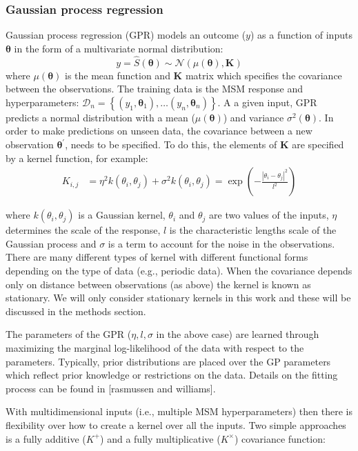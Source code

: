 \documentclass[journal=jacsat,manuscript=article]{achemso}
\begin{document}
\subsubsection{Gaussian process regression}

Gaussian process regression (GPR) models an outcome ($y$) as a function of inputs $\bm{\theta}$ in the form of a multivariate normal distribution: 
\begin{equation}
   y = \hat{S}(\bm{\theta}) \sim \mathcal{N}\left(\mu(\bm{\theta}), \mathbf{K}\right )
\end{equation}
where $\mu(\bm{\theta})$ is the mean function and $\mathbf{K}$ matrix which specifies the covariance between the observations. The training data is the MSM response and hyperparameters: $\mathcal{D}_{n}=\left\{(y_1, \bm{\theta}_1),  \ldots (y_n, \bm{\theta}_n) \right \}$. A a given input, GPR predicts a normal distribution with a mean ($\mu(\bm{\theta})$) and variance $\sigma^{2}(\bm{\theta})$. In order to make predictions on unseen data, the covariance between a new observation $\bm{\theta}^{\prime}$, needs to be specified. To do this, the elements of $\mathbf{K}$ are specified by a kernel function, for example: 
\begin{align}
    K_{i,j} & = \eta^2  k(\theta_i, \theta_j) + \sigma^2
    k(\theta_i, \theta_j) =  \exp\left(-\frac{\left|\theta_i-\theta_j\right|^2}{l^2}\right)
\end{align}

where $k(\theta_i, \theta_j)$ is a Gaussian kernel,  $\theta_i$ and $\theta_j$ are two values of the inputs, $\eta$ determines the scale of the response, $l$ is the characteristic lengths scale of the Gaussian process and $\sigma$ is a term to account for the noise in the observations. There are many different types of kernel with different functional forms depending on the type of data (e.g., periodic data). When the covariance depends only on distance between observations (as above) the kernel is known as stationary.  We will only consider stationary kernels in this work and these will be discussed in the methods section. 

The parameters of the GPR ($\eta, l, \sigma$ in the above case) are learned through maximizing the marginal log-likelihood of the data with respect to the parameters. Typically, prior distributions are placed over the GP parameters which reflect prior knowledge or restrictions on the data. Details on the fitting process can be found in [rasmussen and williams]. 

With multidimensional inputs (i.e., multiple MSM hyperparameters) then there is flexibility over how to create a kernel over all the inputs. Two simple approaches is a fully additive ($K^{\mathrm{+}}$) and a fully multiplicative ($K^{\mathrm{\times}}$) covariance function: 
\end{document}
